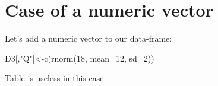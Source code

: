 \documentclass[
  letterpaper,
  DIV=11,
  numbers=noendperiod]{scrreprt}
\newenvironment{Shaded}{\begin{snugshade}}{\end{snugshade}}
\newcommand{\AttributeTok}[1]{\textcolor[rgb]{0.40,0.45,0.13}{#1}}
\newcommand{\DecValTok}[1]{\textcolor[rgb]{0.68,0.00,0.00}{#1}}
\newcommand{\FunctionTok}[1]{\textcolor[rgb]{0.28,0.35,0.67}{#1}}
\newcommand{\NormalTok}[1]{\textcolor[rgb]{0.00,0.23,0.31}{#1}}
\newcommand{\OtherTok}[1]{\textcolor[rgb]{0.00,0.23,0.31}{#1}}
\newcommand{\StringTok}[1]{\textcolor[rgb]{0.13,0.47,0.30}{#1}}
\begin{document}
\section{Case of a numeric vector}\label{case-of-a-numeric-vector}

Let's add a numeric vector to our data-frame:

\begin{Shaded}
\begin{Highlighting}[]
\NormalTok{D3[,}\StringTok{"Q"}\NormalTok{]}\OtherTok{\textless{}{-}}\FunctionTok{c}\NormalTok{(}\FunctionTok{rnorm}\NormalTok{(}\DecValTok{18}\NormalTok{, }\AttributeTok{mean=}\DecValTok{12}\NormalTok{, }\AttributeTok{sd=}\DecValTok{2}\NormalTok{))}
\end{Highlighting}
\end{Shaded}

Table is useless in this case
\end{document}

